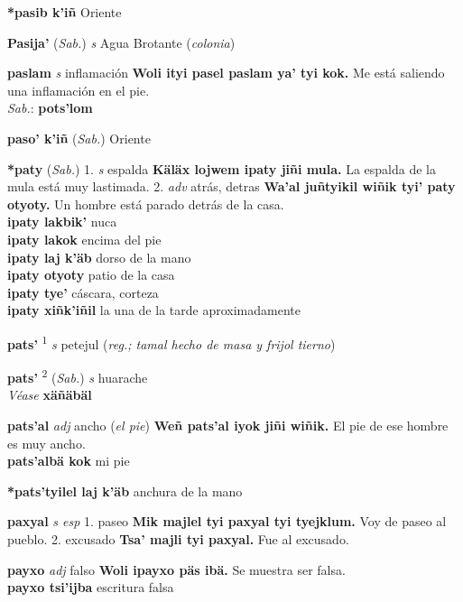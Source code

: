 \documentclass[10pt]{scrbook}
\newcommand{\entry}[1]{\textbf{#1}}
\newcommand{\onedefinition}[1]{#1.}
\newcommand{\defsuperscript}[1]{\textsuperscript{#1}}
\newcommand{\partofspeech}[1]{\textit{#1}}
\newcommand{\spanishtranslation}[1]{#1}
\newcommand{\clarification}[1]{(\textit{#1})}
\newcommand{\cholexample}[1]{\textbf{#1}}
\newcommand{\exampletranslation}[1]{#1}
\newcommand{\dialectvariant}[1]{\\\textit{#1}:}
\newcommand{\dialectword}[1]{\textbf{#1}}
\newcommand{\alsosee}[1]{\\\textit{Véase} \textbf{#1}}
\newcommand{\relevantdialect}[1]{(\textit{#1})}
\newcommand{\secondaryentry}[1]{\\\textbf{#1}}
\newcommand{\secondtranslation}[1]{#1}
\begin{document}
\begin{multicols}{2}
\entry{*pasib k'iñ}
\spanishtranslation{Oriente}

\entry{Pasija'}
\relevantdialect{Sab.}
\partofspeech{s}
\spanishtranslation{Agua Brotante}
\clarification{colonia}

\entry{paslam}
\partofspeech{s}
\spanishtranslation{inflamación}
\cholexample{Woli ityi pasel paslam ya' tyi kok.}
\exampletranslation{Me está saliendo una inflamación en el pie.}
\dialectvariant{Sab.}
\dialectword{pots'lom}

\entry{paso' k'iñ}
\relevantdialect{Sab.}
\spanishtranslation{Oriente}

\entry{*paty}
\relevantdialect{Sab.}
\onedefinition{1}
\partofspeech{s}
\spanishtranslation{espalda}
\cholexample{Käläx lojwem ipaty jiñi mula.}
\exampletranslation{La espalda de la mula está muy lastimada.}
\onedefinition{2}
\partofspeech{adv}
\spanishtranslation{atrás, detras}
\cholexample{Wa'al juñtyikil wiñik tyi' paty otyoty.}
\exampletranslation{Un hombre está parado detrás de la casa.}
\secondaryentry{ipaty lakbik'}
\secondtranslation{nuca}
\secondaryentry{ipaty lakok}
\secondtranslation{encima del pie}
\secondaryentry{ipaty laj k'äb}
\secondtranslation{dorso de la mano}
\secondaryentry{ipaty otyoty}
\secondtranslation{patio de la casa}
\secondaryentry{ipaty tye'}
\secondtranslation{cáscara, corteza}
\secondaryentry{ipaty xiñk'iñil}
\secondtranslation{la una de la tarde aproximadamente}

\entry{pats'}
\defsuperscript{1}
\partofspeech{s}
\spanishtranslation{petejul}
\clarification{reg.; tamal hecho de masa y frijol tierno}

\entry{pats'}
\defsuperscript{2}
\relevantdialect{Sab.}
\partofspeech{s}
\spanishtranslation{huarache}
\alsosee{xäñäbäl}

\entry{pats'al}
\partofspeech{adj}
\spanishtranslation{ancho}
\clarification{el pie}
\cholexample{Weñ pats'al iyok jiñi wiñik.}
\exampletranslation{El pie de ese hombre es muy ancho.}
\secondaryentry{pats'albä kok}
\secondtranslation{mi pie}

\entry{*pats'tyilel laj k'äb}
\spanishtranslation{anchura de la mano}

\entry{paxyal}
\partofspeech{s esp}
\onedefinition{1}
\spanishtranslation{paseo}
\cholexample{Mik majlel tyi paxyal tyi tyejklum.}
\exampletranslation{Voy de paseo al pueblo.}
\onedefinition{2}
\spanishtranslation{excusado}
\cholexample{Tsa' majli tyi paxyal.}
\exampletranslation{Fue al excusado.}

\entry{payxo}
\partofspeech{adj}
\spanishtranslation{falso}
\cholexample{Woli ipayxo päs ibä.}
\exampletranslation{Se muestra ser falsa.}
\secondaryentry{payxo tsi'ijba}
\secondtranslation{escritura falsa}


\end{multicols}
\end{document}
